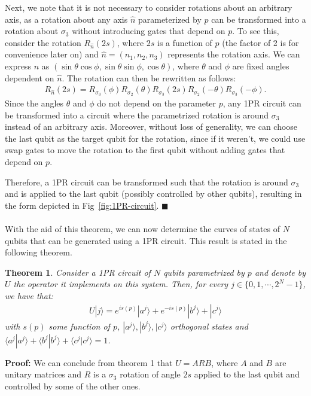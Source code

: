 \documentclass[10pt,letterpaper]{article} %
\newcommand{\fref}[1]{Fig~\ref{#1}}
\newtheorem{theorem}{Theorem}
\begin{document}
Next, we note that it is not necessary to consider rotations about an arbitrary axis,
as a rotation about any axis $\hat{n}$ parameterized by $p$
can be transformed into a rotation about $\sigma_3$ without introducing 
gates that depend on $p$. To see this, consider the rotation $R_{\hat{n}}(2s)$, where $2s$ 
is a function of $p$ (the factor of 2 is for convenience later on) 
and $\hat{n} = (n_1,n_2,n_3)$ represents the rotation axis. 
We can express $\hat{n}$ as $(\sin \theta \cos \phi, \sin \theta \sin \phi, \cos \theta)$, 
where $\theta$ and $\phi$ are fixed angles dependent on $\hat{n}$. 
The rotation can then be rewritten as follows:
\begin{eqnarray}
R_{\hat{n}}(2s) = R_{\sigma_3}(\phi) R_{\sigma_2}(\theta) R_{\sigma_3}(2s) R_{\sigma_2}(-\theta) R_{\sigma_3}(-\phi).
\end{eqnarray}
Since the angles $\theta$ and $\phi$ do not depend on the parameter $p$,
any 1PR circuit can be transformed into a circuit where the parametrized
 rotation is around $\sigma_3$ instead of an arbitrary axis. 
Moreover, without loss of generality, we can choose the last qubit as the
target qubit for the rotation, since if it weren't, we could use
swap gates to move the rotation
to the first qubit without adding gates
that depend on $p$. 

Therefore, a 1PR circuit can be transformed such
that the rotation is around $\sigma_3$ and is applied to the last qubit 
(possibly controlled by other qubits), 
resulting in the form depicted in \fref{fig:1PR-circuit}. 
$\blacksquare$ \\
$\;$\\

With the aid of this theorem, we can now determine the curves
of states of $N$ qubits that can be generated using a 1PR circuit. 
This result is stated in the following theorem.

\begin{theorem}
\label{theorem2}
Consider a 1PR circuit of $N$ qubits parametrized by $p$
and denote by $U$ the operator it implements on this system. 
Then, for every $j \in \{0, 1, \cdots, 2^N-1\}$, 
we have that:
\begin{align*}
U|j\rangle = e^{is(p)} |a^j\rangle + e^{-is(p)} |b^j\rangle + |c^j\rangle
\end{align*}
with $s(p)$ some function of $p$,  $|a^j\rangle ,|b^j\rangle, |c^j\rangle$ orthogonal states and $\langle a^j| a^j\rangle + \langle b^j| b^j\rangle + \langle
c^j|c^j \rangle = 1$.
\end{theorem}
\textbf{Proof:} 
We can conclude from theorem 1 that $U=ARB$,
where $A$ and $B$ are unitary matrices and $R$ is a $\sigma_3$ rotation of angle $2s$
applied to the last qubit and controlled by some of the other ones. 
\end{document}

